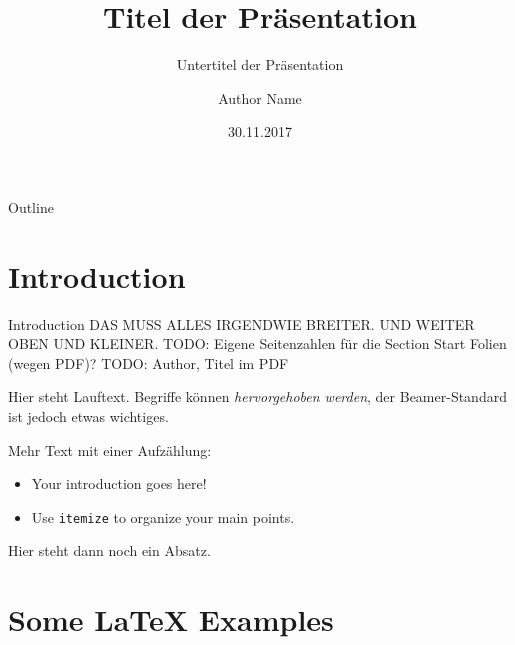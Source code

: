 \documentclass[10pt]{beamer}
\title[HAW Hamburg Beamer]{Titel der Präsentation}
\subtitle{Untertitel der Präsentation}
\author{Author Name}
\institute{Hochschule für Angewandte Wissenschaften Hamburg}
\date{30.11.2017}
\begin{document}
\begin{frame}
  \titlepage
\end{frame}

\begin{frame}{Outline}
  \tableofcontents
\end{frame}

\section{Introduction}
\begin{frame}{Introduction}
  DAS MUSS ALLES IRGENDWIE BREITER. UND WEITER OBEN UND KLEINER.
  TODO: Eigene Seitenzahlen für die Section Start Folien (wegen PDF)?
  TODO: Author, Titel im PDF


  Hier steht Lauftext. Begriffe können \emph{hervorgehoben werden}, der Beamer-Standard ist jedoch \alert{etwas wichtiges}.

  Mehr Text mit einer Aufzählung:
  \begin{itemize}
    \item Your introduction goes here!
    \item Use \texttt{itemize} to organize your main points.
  \end{itemize}

  Hier steht dann noch ein Absatz.
\end{frame}


\section{Some \LaTeX{} Examples}
\end{document}

